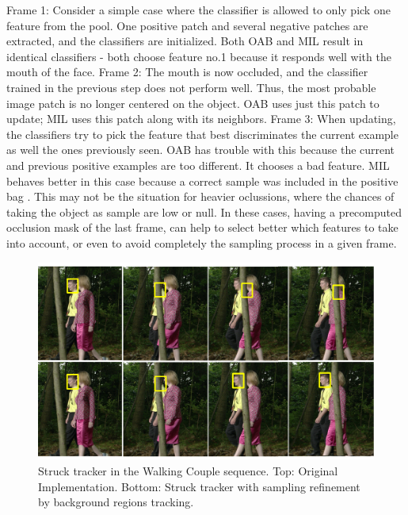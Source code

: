 Frame 1: Consider a simple case where the classiﬁer is allowed
to only pick one feature from the pool. One positive patch and several negative patches are extracted, and 
the classiﬁers are initialized. Both OAB and MIL result in identical classiﬁers - both choose feature no.1 because it responds well with the mouth of
the face. Frame 2: The mouth is now occluded, and the classiﬁer trained in the previous step does not perform well. Thus, the most probable image patch is no
longer centered on the object. OAB uses just this patch to update; MIL uses this patch along with its neighbors. Frame 3: When updating, the classiﬁers try to pick the feature that best discriminates the current example as well
the ones previously seen. OAB has trouble with this because the current and previous positive examples are too different. It chooses a bad feature.
MIL behaves better in this case because a correct sample was included in the positive bag \cite{c25}. This may not be the situation for heavier oclussions, where the chances of taking the object as sample are low or null. In these cases, having a precomputed occlusion mask of the last frame, 
can help to select better which features to take into account, or even to avoid completely the sampling process in a given frame. 
  
   \begin{figure}[thpb]
      \centering
      \includegraphics[width=1.0\textwidth]{../images/struckComp.png}
      \caption{Struck tracker in the Walking Couple sequence. Top: Original Implementation. Bottom: Struck tracker with sampling refinement by background regions tracking.}
      \label{tr_strucktest}
   \end{figure}
 
